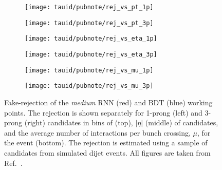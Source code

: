\begin{figure}[htbp]

  \begin{subfigure}{0.498\textwidth}
    \texttt{[image: tauid/pubnote/rej\_vs\_pt\_1p]}
    \subcaption{}%
    \label{fig:tauid_faketau_rej_a}
  \end{subfigure}\hfill%
  \begin{subfigure}{0.498\textwidth}
    \texttt{[image: tauid/pubnote/rej\_vs\_pt\_3p]}
    \subcaption{}%
    \label{fig:tauid_faketau_rej_b}
  \end{subfigure}

  \begin{subfigure}{0.498\textwidth}
    \texttt{[image: tauid/pubnote/rej\_vs\_eta\_1p]}
    \subcaption{}
  \end{subfigure}\hfill%
  \begin{subfigure}{0.498\textwidth}
    \texttt{[image: tauid/pubnote/rej\_vs\_eta\_3p]}
    \subcaption{}
  \end{subfigure}

  \begin{subfigure}{0.498\textwidth}
    \texttt{[image: tauid/pubnote/rej\_vs\_mu\_1p]}
    \subcaption{}%
    \label{fig:tauid_faketau_rej_e}
  \end{subfigure}\hfill%
  \begin{subfigure}{0.498\textwidth}
    \texttt{[image: tauid/pubnote/rej\_vs\_mu\_3p]}
    \subcaption{}%
    \label{fig:tauid_faketau_rej_f}
  \end{subfigure}

  \caption[Fake-\tauhadvis rejection of the \emph{medium} RNN and BDT \tauid
  working points]{Fake-\tauhadvis rejection of the \emph{medium} RNN (red) and
    BDT (blue) \tauid working points. The rejection is shown separately for
    1-prong (left) and 3-prong (right) \tauhadvis candidates in bins of \pT
    (top), $|\eta|$ (middle) of \tauhadvis candidates, and the average number of
    interactions per bunch crossing, $\mu$, for the event (bottom). The
    rejection is estimated using a sample of \tauhadvis candidates from
    simulated dijet events. All figures are taken from
    Ref.~\cite{ATL-PHYS-PUB-2019-033}.}%
  \label{fig:tauid_faketau_rej}
\end{figure}

